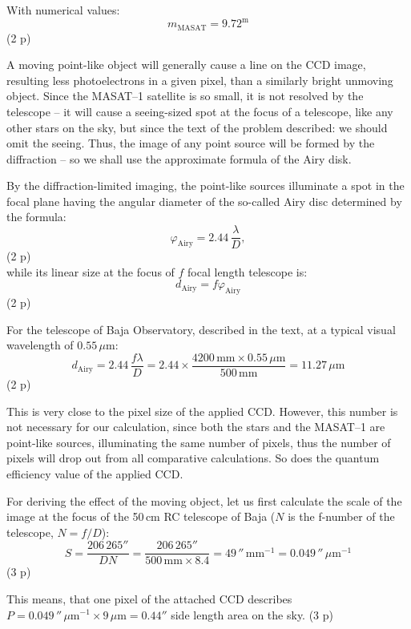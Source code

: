 \begin{description}
With numerical values:
\[ m_{\mathrm{MASAT}} = 9.72^{\mathrm{m}} \]
\hfill(2 p)

\item[b)] A moving point-like object will generally cause a line on the CCD
image, resulting less photoelectrons in a given pixel, than a similarly
bright unmoving object. Since the MASAT--1 satellite is so small, it is not
resolved by the telescope -- it will cause a seeing-sized spot at the focus
of a telescope, like any other stars on the sky, but since the text of the
problem described: we should omit the seeing. Thus, the image of any point
source will be formed by the diffraction -- so we shall use the approximate
formula of the Airy disk.

By the diffraction-limited imaging, the point-like sources illuminate a spot
in the focal plane having the angular diameter of the so-called Airy disc
determined by the formula:
\begin{equation*}
\varphi_{\mathrm{Airy}} = 2.44\,\frac{\lambda}{D}, \tag{14.4}
\end{equation*}
\hfill(2 p)\\
while its linear size at the focus of $f$ focal length telescope is:
\begin{equation*}
d_{\mathrm{Airy}} = f\varphi_{\mathrm{Airy}} \tag{14.5}
\end{equation*}
\hfill(2 p)

For the telescope of Baja Observatory, described in the text, at a typical
visual wavelength of $0.55\,\mu\mathrm{m}$:
\[ d_{\mathrm{Airy}} = 2.44\,\frac{f\lambda}{D}
   = 2.44 \times \frac{4200\,\mathrm{mm} \times 0.55\,\mu\mathrm{m}}
     {500\,\mathrm{mm}}
   = 11.27\,\mu\mathrm{m} \]
\hfill(2 p)

This is very close to the pixel size of the applied CCD. However, this
number is not necessary for our calculation, since both the stars and the
MASAT--1 are point-like sources, illuminating the same number of pixels, thus
the number of pixels will drop out from all comparative calculations. So
does the quantum efficiency value of the applied CCD.

For deriving the effect of the moving object, let us first calculate the
scale of the image at the focus of the 50\,cm RC telescope of Baja ($N$ is
the f-number of the telescope, $N = f/D$):
\[ S = \frac{206\,265''}{DN}
     = \frac{206\,265''}{500\,\mathrm{mm} \times 8.4}
     = 49\,''\,\mathrm{mm^{-1}} = 0.049\,''\,\mu\mathrm{m}^{-1} \]
\hfill(3 p)

This means, that one pixel of the attached CCD describes
$P = 0.049\,''\,\mu\mathrm{m}^{-1} \times 9\,\mu\mathrm{m} = 0.44''$
side length area on the sky. \hfill(3 p)


\end{description}
